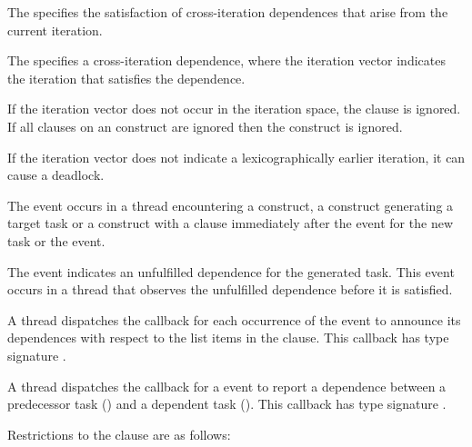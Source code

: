 The   specifies the satisfaction of
cross-iteration dependences that arise from the current iteration.

The   specifies a cross-iteration dependence,
where the iteration vector  indicates the iteration that satisfies
the dependence.

If the iteration vector  does not occur in the iteration space,
the  clause is ignored.  If all  clauses on an
 construct are ignored then the construct is ignored.

\begin{note}
If the iteration vector  does not indicate a lexicographically 
earlier iteration, it can cause a deadlock.
\end{note}

\events

The  event occurs in a thread encountering a
 construct, a construct generating a target task or a 
construct with a  clause immediately after 
the  event for the new task or the  event.

The  event indicates an unfulfilled dependence for the 
generated task. This event occurs in a thread that observes the unfulfilled 
dependence before it is satisfied. 

\tools

A thread dispatches the  callback
for each occurrence of the  event to
announce its dependences with respect to the list items in the 
 clause. This callback has type signature
.

A thread dispatches the 
callback for a  event to report a
dependence between a predecessor task  () 
and a dependent task ().  This callback 
has type signature .

\restrictions
Restrictions to the  clause are as follows:

